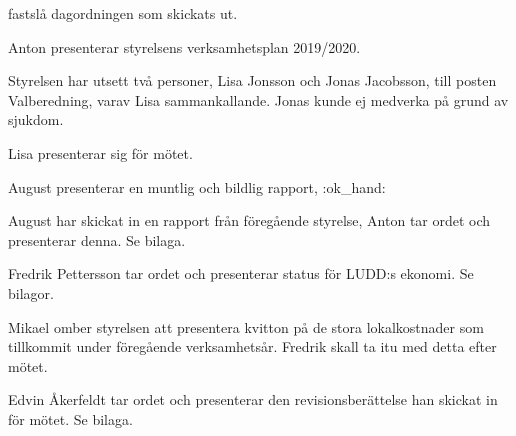 \documentclass{protokoll}
\date{2019-10-07}  %
\begin{document}
\newpage  


\begin{beslut}
     \att fastslå dagordningen som skickats ut.
\end{beslut}


Anton presenterar styrelsens verksamhetsplan 2019/2020. 

Styrelsen har utsett två personer, Lisa Jonsson och Jonas Jacobsson, till 
posten Valberedning, varav Lisa sammankallande. Jonas kunde ej medverka på
grund av sjukdom. 

Lisa presenterar sig för mötet. 


August presenterar en muntlig och bildlig rapport, :ok_hand:

August har skickat in en rapport från föregående styrelse, Anton tar ordet och 
presenterar denna. Se bilaga.

Fredrik Pettersson tar ordet och presenterar status för LUDD:s ekonomi. 
Se bilagor.


Mikael omber styrelsen att presentera kvitton på de stora lokalkostnader som
tillkommit under föregående verksamhetsår. Fredrik skall ta itu med detta efter
mötet.

Edvin Åkerfeldt tar ordet och presenterar den revisionsberättelse han skickat
in för mötet. Se bilaga.
\end{document}
